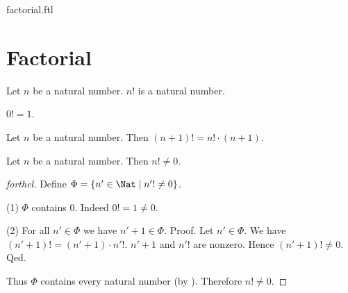\documentclass{naproche-library}
\begin{document}
\begin{smodule}{factorial.ftl}

  \section*{Factorial}

  \begin{signature}[forthel,id=ARITHMETIC_12_0210357812531785]
    Let $n$ be a natural number.
    $n!$ is a natural number.
  \end{signature}

  \begin{axiom}[forthel,id=ARITHMETIC_12_6945210541236989]
    $0! = 1$.
  \end{axiom}

  \begin{axiom}[forthel,id=ARITHMETIC_12_2312015846987452]
    Let $n$ be a natural number.
    Then $(n + 1)! = n! \cdot (n + 1)$.
  \end{axiom}

  \begin{proposition}[forthel,id=ARITHMETIC_12_6123519005949952]
    Let $n$ be a natural number.
    Then $n! \neq 0$.
  \end{proposition}
  \begin{proof}[forthel]
    Define $\Phi = \{n' \in \Nat \mid n'! \neq 0 \}$.

    (1) $\Phi$ contains $0$.
    Indeed $0! = 1 \neq 0$.

    (2) For all $n' \in \Phi$ we have $n' + 1 \in \Phi$. \newline
    Proof.
      Let $n' \in \Phi$.
      We have $(n' + 1)! = (n' + 1) \cdot n'!$.
      $n' + 1$ and $n'!$ are nonzero.
      Hence $(n' + 1)! \neq 0$.
    Qed.

    Thus $\Phi$ contains every natural number (by ).
    Therefore $n! \neq 0$.
  \end{proof}
\end{smodule}
\end{document}
